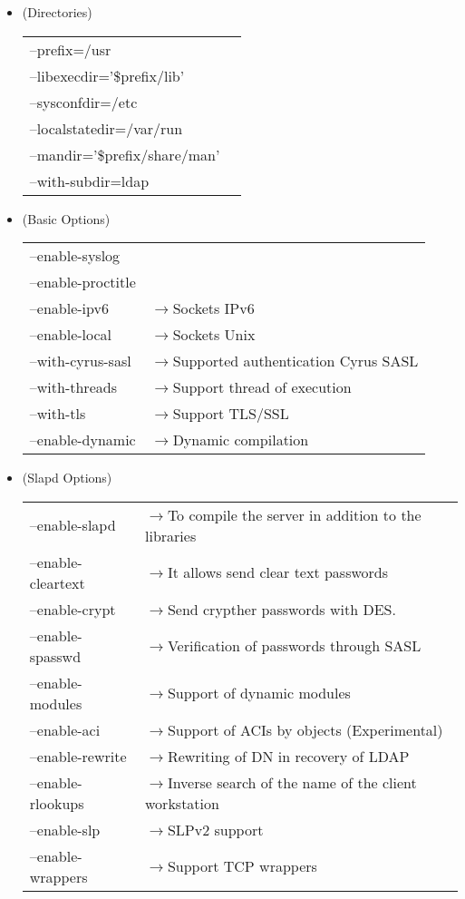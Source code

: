 \begin{itemize}
\item[](Directories)\\
\begin{tabular}{|ll|}\hline
--prefix=/usr & \\
--libexecdir='\${prefix}/lib' & \\
--sysconfdir=/etc & \\
--localstatedir=/var/run & \\
--mandir='\${prefix}/share/man' & \\
--with-subdir=ldap & \\
\hline \end{tabular}

\item[](Basic Options)\\
\begin{tabular}{|ll|}\hline
--enable-syslog & \\
--enable-proctitle & \\
--enable-ipv6 & $\rightarrow$Sockets IPv6\\
--enable-local & $\rightarrow$Sockets Unix\\
--with-cyrus-sasl & $\rightarrow$Supported authentication Cyrus SASL\\
--with-threads & $\rightarrow$Support thread of execution\\
--with-tls & $\rightarrow$Support TLS/SSL\\
--enable-dynamic & $\rightarrow$Dynamic compilation\\
\hline \end{tabular}

\item[](Slapd Options)\\
\begin{tabular}{|ll|}\hline
--enable-slapd & $\rightarrow$To compile the server in addition to the libraries\\
--enable-cleartext & $\rightarrow$It allows send clear text passwords\\
--enable-crypt & $\rightarrow$Send crypther passwords with DES.\\
--enable-spasswd & $\rightarrow$Verification of passwords through SASL\\
--enable-modules & $\rightarrow$Support of dynamic modules\\
--enable-aci & $\rightarrow$Support of ACIs by objects (Experimental)\\
--enable-rewrite & $\rightarrow$Rewriting of DN in recovery of LDAP\\
--enable-rlookups & $\rightarrow$Inverse search of the name of the client workstation\\
--enable-slp & $\rightarrow$SLPv2 support\\
--enable-wrappers & $\rightarrow$Support TCP wrappers\\
\hline \end{tabular}


\end{itemize}
